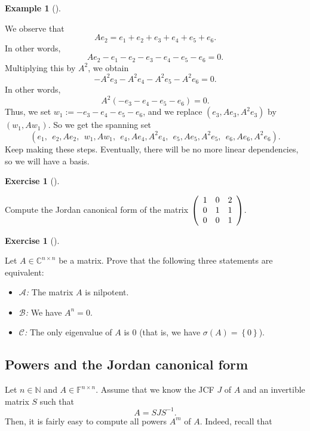 \documentclass[numbers=enddot,12pt,final,onecolumn,notitlepage]{scrartcl}%
\newcounter{exer}
\numberwithin{exer}{subsection}
\theoremstyle{definition}
\newtheorem{exam}[theo]{Example}
\newenvironment{example}[1][]
{\begin{exam}[#1]\begin{leftbar}}
{\end{leftbar}\end{exam}}
\newtheorem{exmp}[exer]{Exercise}
\newenvironment{exercise}[1][]
{\begin{exmp}[#1]\begin{leftbar}}
{\end{leftbar}\end{exmp}}
\begin{document}
\begin{example}
We observe that%
\[
Ae_{2}=e_{1}+e_{2}+e_{3}+e_{4}+e_{5}+e_{6}.
\]
In other words,%
\[
Ae_{2}-e_{1}-e_{2}-e_{3}-e_{4}-e_{5}-e_{6}=0.
\]
Multiplying this by $A^{2}$, we obtain%
\[
-A^{2}e_{3}-A^{2}e_{4}-A^{2}e_{5}-A^{2}e_{6}=0.
\]
In other words,%
\[
A^{2}\left(  -e_{3}-e_{4}-e_{5}-e_{6}\right)  =0.
\]
Thus, we set $w_{1}:=-e_{3}-e_{4}-e_{5}-e_{6}$, and we replace $\left(
e_{3},Ae_{3},A^{2}e_{3}\right)  $ by $\left(  w_{1},Aw_{1}\right)  $. So we
get the spanning set
\[
\left(  e_{1},\ \ e_{2},Ae_{2},\ \ w_{1},Aw_{1},\ \ e_{4},Ae_{4},A^{2}%
e_{4},\ \ e_{5},Ae_{5},A^{2}e_{5},\ \ e_{6},Ae_{6},A^{2}e_{6}\right)  .
\]
Keep making these steps. Eventually, there will be no more linear
dependencies, so we will have a basis.
\end{example}

\begin{exercise}
 Compute the Jordan canonical form of the matrix $\left(
\begin{array}
[c]{ccc}%
1 & 0 & 2\\
0 & 1 & 1\\
0 & 0 & 1
\end{array}
\right)  $.
\end{exercise}

\begin{exercise}
\label{exe.jnf.step3.An=0} Let $A\in\mathbb{C}^{n\times n}$ be a
matrix. Prove that the following three statements are equivalent:

\begin{itemize}
\item $\mathcal{A}$\textit{:} The matrix $A$ is nilpotent.

\item $\mathcal{B}$\textit{:} We have $A^{n}=0$.

\item $\mathcal{C}$\textit{:} The only eigenvalue of $A$ is $0$ (that is, we
have $\sigma\left(  A\right)  =\left\{  0\right\}  $).
\end{itemize}
\end{exercise}

\subsection{Powers and the Jordan canonical form}

Let $n\in\mathbb{N}$ and $A\in\mathbb{F}^{n\times n}$. Assume that we know the
JCF $J$ of $A$ and an invertible matrix $S$ such that
\[
A=SJS^{-1}.
\]
Then, it is fairly easy to compute all powers $A^{m}$ of $A$. Indeed, recall that
\end{document}
